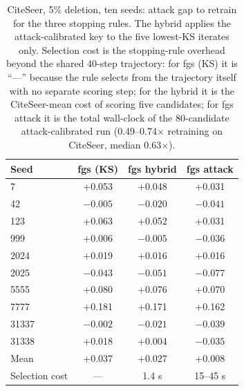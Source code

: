 \documentclass[pdflatex,sn-basic,Numbered]{sn-jnl}
\begin{document}
\begin{table}[htbp]\centering\small
\caption{CiteSeer, 5\% deletion, ten seeds: attack gap to retrain for the three stopping rules. The hybrid applies the attack-calibrated key to the five lowest-KS iterates only. Selection cost is the stopping-rule overhead beyond the shared 40-step trajectory: for fgs (KS) it is ``---'' because the rule selects from the trajectory itself with no separate scoring step; for the hybrid it is the CiteSeer-mean cost of scoring five candidates; for fgs attack it is the total wall-clock of the 80-candidate attack-calibrated run (0.49--0.74$\times$ retraining on CiteSeer, median 0.63$\times$).}
\begin{tabular}{lccc}\toprule Seed & fgs (KS) & fgs hybrid & fgs attack\\\midrule
7 & +0.053 & +0.048 & +0.031\\
42 & $-0.005$ & $-0.020$ & $-0.041$\\
123 & +0.063 & +0.052 & +0.031\\
999 & +0.006 & $-0.005$ & $-0.036$\\
2024 & +0.019 & +0.016 & +0.016\\
2025 & $-0.043$ & $-0.051$ & $-0.077$\\
5555 & +0.080 & +0.076 & +0.070\\
7777 & +0.181 & +0.171 & +0.162\\
31337 & $-0.002$ & $-0.021$ & $-0.039$\\
31338 & +0.018 & +0.004 & $-0.035$\\
Mean & +0.037 & +0.027 & +0.008\\
Selection cost & --- & 1.4 s & 15--45 s\\\bottomrule
\end{tabular}\end{table}
\end{document}
